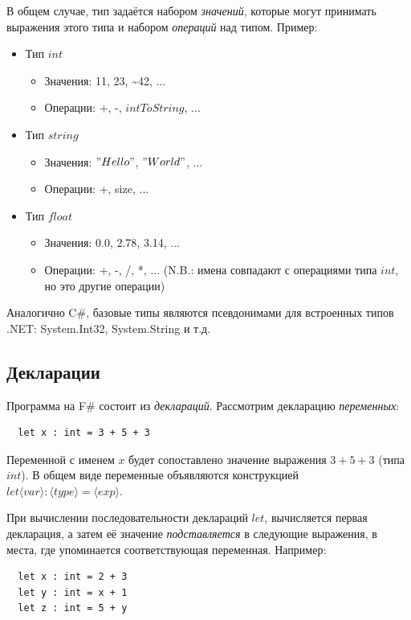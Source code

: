 \documentclass[a4paper,11pt]{article}
\begin{document}
В общем случае, тип задаётся набором \emph{значений}, которые могут принимать
выражения этого типа и набором \emph{операций} над типом. Пример:
\begin{itemize}
\item Тип $int$
  \begin{itemize}
  \item Значения: 11, 23, \textasciitilde 42, ...
  \item Операции: +, -, $intToString$, ...
  \end{itemize}
\item Тип $string$
  \begin{itemize}
  \item Значения: $"Hello"$, $"World"$, ...
  \item Операции: +, size, ...
  \end{itemize}
\item Тип $float$
  \begin{itemize}
  \item Значения: 0.0, 2.78, 3.14, ...
  \item Операции: +, -, /, *, ... (N.B.: имена совпадают с операциями типа
    $int$, но это другие операции)
  \end{itemize}
\end{itemize}

Аналогично C\#, базовые типы являются псевдонимами для встроенных типов .NET:
System.Int32, System.String и т.д.

\subsection{Декларации}

Программа на F\# состоит из \emph{деклараций}. Рассмотрим декларацию
\emph{переменных}:

\begin{lstlisting}
  let x : int = 3 + 5 + 3
\end{lstlisting}

Переменной с именем $x$ будет сопоставлено значение выражения $3 + 5 + 3$ (типа
$int$). В общем виде переменные объявляются конструкцией $let 
\langle var \rangle : \langle type \rangle = \langle exp \rangle$.

При вычислении последовательности деклараций $let$, вычисляется первая
декларация, а затем её значение \emph{подставляется} в следующие выражения,
в места, где упоминается соответствующая переменная. Например:

\begin{lstlisting}
  let x : int = 2 + 3
  let y : int = x + 1
  let z : int = 5 + y
\end{lstlisting}
\end{document}
